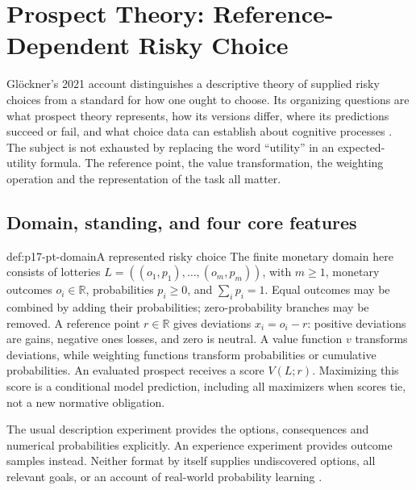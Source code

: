 \chapter{Prospect Theory: Reference-Dependent Risky Choice}
\label{sec:p17-rationality-8-3}

Gl\"ockner's 2021 account distinguishes a descriptive theory of supplied
risky choices from a standard for how one ought to choose. Its organizing
questions are what prospect theory represents, how its versions differ,
where its predictions succeed or fail, and what choice data can establish
about cognitive processes \cite[pp.~485--493]{Glockner2021ProspectTheory}.
The subject is not exhausted by replacing the word ``utility'' in an
expected-utility formula. The reference point, the value transformation,
the weighting operation and the representation of the task all matter.

\section{Domain, standing, and four core features}

\begin{hbdefinition}{def:p17-pt-domain}{A represented risky choice}
The finite monetary domain here consists of lotteries
\(L=((o_1,p_1),\ldots,(o_m,p_m))\), with \(m\geq1\), monetary
outcomes \(o_i\in\mathbb R\), probabilities \(p_i\geq0\), and
\(\sum_i p_i=1\). Equal outcomes may be combined by adding their
probabilities; zero-probability branches may be removed. A reference
point \(r\in\mathbb R\) gives deviations \(x_i=o_i-r\): positive
deviations are gains, negative ones losses, and zero is neutral. A
value function \(v\) transforms deviations, while weighting functions
transform probabilities or cumulative probabilities. An evaluated
prospect receives a score \(V(L;r)\). Maximizing this score is a
conditional model prediction, including all maximizers when scores tie,
not a new normative obligation.

The usual description experiment provides the options, consequences and
numerical probabilities explicitly. An experience experiment provides
outcome samples instead. Neither format by itself supplies undiscovered
options, all relevant goals, or an account of real-world probability
learning \cite[pp.~485, 489--490]{Glockner2021ProspectTheory}.
\end{hbdefinition}

